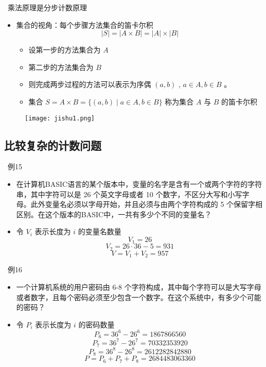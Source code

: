 \documentclass[UTF8]{report}
\theoremstyle{MyLineTheoremStyle} %
\theoremstyle{MyBlockTheoremStyle} %
\theoremstyle{MySubsubsectionStyle} %
\begin{document}
\textbullet\ 乘法原理是分步计数原理
\begin{itemize}
    \item 集合的视角：每个步骤方法集合的笛卡尔积
    \[
    |S| = |A \times B| = |A| \times |B|
    \]
    \begin{itemize}
        \item 设第一步的方法集合为 $A$
        \item 第二步的方法集合为 $B$
        \item 则完成两步过程的方法可以表示为序偶 $(a, b)$ , $a \in A, b \in B$ 。
        \item 集合 $S = A \times B = \{(a, b) \mid a \in A, b \in B\}$ 称为集合 $A$ 与 $B$ 的笛卡尔积
    \end{itemize}
\end{itemize}

\begin{figure}[H]
    \centering
    \texttt{[image: jishu1.png]}
\end{figure}

\subsection{比较复杂的计数问题}
\textbullet\ 例15
\begin{itemize}
    \item 在计算机BASIC语言的某个版本中，变量的名字是含有一个或两个字符的字符串，其中字符可以是 26 个英文字母或者 10 个数字，不区分大写和小写字母。此外变量名必须以字母开始，并且必须与由两个字符构成的 5 个保留字相区别。在这个版本的BASIC中，一共有多少个不同的变量名？
    \item 令 $V_i$ 表示长度为 $i$ 的变量名数量
    \[
    V_1 = 26
    \]
    \[
    V_2 = 26 \cdot 36 - 5 = 931
    \]
    \[
    V = V_1 + V_2 = 957
    \]
\end{itemize}

\textbullet\ 例16
\begin{itemize}
    \item 一个计算机系统的用户密码由 6-8 个字符构成，其中每个字符可以是大写字母或者数字，且每个密码必须至少包含一个数字。在这个系统中，有多少个可能的密码？
    \item 令 $P_i$ 表示长度为 $i$ 的密码数量
    \[
    P_6 = 36^6 - 26^6 = 1867866560
    \]
    \[
    P_7 = 36^7 - 26^7 = 70332353920
    \]
    \[
    P_8 = 36^8 - 26^8 = 2612282842880
    \]
    \[
    P = P_6 + P_7 + P_8 = 2684483063360
    \]
\end{itemize}
\end{document}
